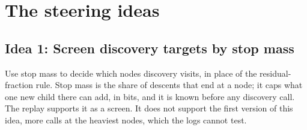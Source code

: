 \documentclass[10pt,a4paper]{article}
\begin{document}
\section{The steering ideas}

\subsection{Idea 1: Screen discovery targets by stop mass}

Use stop mass to decide which nodes discovery visits, in place of the residual-fraction rule. Stop mass is
the share of descents that end at a node; it caps what one new child there can add, in bits, and it is known
before any discovery call. The replay supports it as a screen. It does not support the first version of this
idea, more calls at the heaviest nodes, which the logs cannot test.
\end{document}
